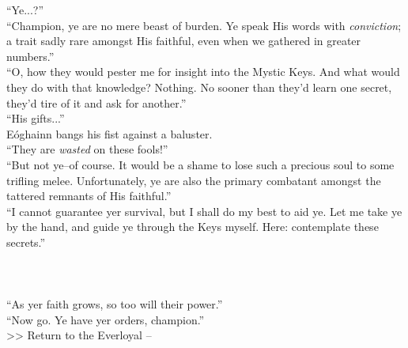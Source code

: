 “Ye...?”\\

“Champion, ye are no mere beast of burden. Ye speak His words with \emph{conviction}; a trait sadly rare amongst His faithful, even when we gathered in greater numbers.”\\

“O, how they would pester me for insight into the Mystic Keys. And what would they do with that knowledge? Nothing. No sooner than they’d learn one secret, they’d tire of it and ask for another.”\\

“His gifts...”\\

Eóghainn bangs his fist against a baluster.\\
“They are \emph{wasted} on these fools!”\\

“But not ye--of course. It would be a shame to lose such a precious soul to some trifling melee. Unfortunately, ye are also the primary combatant amongst the tattered remnants of His faithful.”\\

“I cannot guarantee yer survival, but I shall do my best to aid ye. Let me take ye by the hand, and guide ye through the Keys myself. Here: contemplate these secrets.”\\
\\
\\
\\

“As yer faith grows, so too will their power.”\\

“Now go. Ye have yer orders, champion.”\\

>> Return to the Everloyal -- 